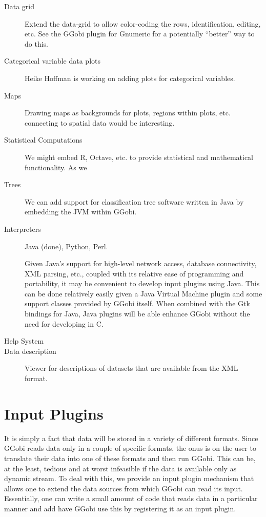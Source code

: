 \documentclass{article}
\begin{document}
\begin{description}

\item[Data grid] Extend the data-grid to allow color-coding the rows,
identification, editing, etc.  See the GGobi plugin for Gnumeric for a
potentially ``better'' way to do this.

\item[Categorical variable data plots]
Heike Hoffman is working on
adding plots for categorical variables.

\item[Maps]
Drawing maps  as backgrounds for plots,
regions within plots, etc.
connecting to spatial data would be interesting.

\item[Statistical Computations] We might embed R, Octave, etc.  to
provide statistical and mathematical functionality.  As we

\item[Trees]
We can add support for classification tree software
written in Java by embedding the JVM within GGobi.

\item[Interpreters]
Java (done), Python, Perl.

Given Java's support for high-level network access, database
connectivity, XML parsing, etc., coupled with its relative ease of
programming and portability, it may be convenient to develop input
plugins using Java.  This can be done relatively easily given a Java
Virtual Machine plugin and some support classes provided by GGobi
itself. When combined with the Gtk bindings for Java, Java plugins
will be able enhance GGobi without the need for developing in C.


\item[Help System]


\item[Data description] Viewer for descriptions of datasets that are
available from the XML format.

\end{description}

\section{Input Plugins}\label{sec:InputPlugins}
It is simply a fact that data will be stored in a variety of different
formats. Since GGobi reads data only in a couple of specific formats,
the onus is on the user to translate their data into one of these
formats and then run GGobi. This can be, at the least, tedious and at
worst infeasible if the data is available only as dynamic stream.  To
deal with this, we provide an input plugin mechanism that allows one
to extend the data sources from which GGobi can read its input.
Essentially, one can write a small amount of code that reads
data in a particular manner and add have GGobi use this 
by registering it as an input plugin.
\end{document}
